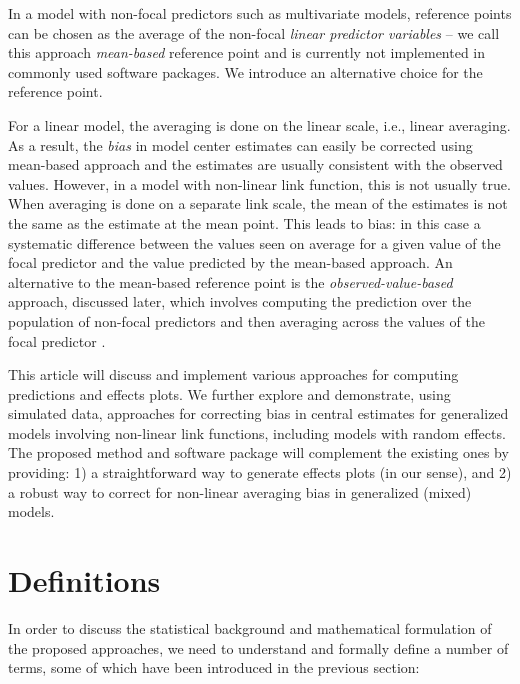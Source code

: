 In a model with non-focal predictors such as multivariate models, reference points can be chosen as the average of the non-focal \emph{linear predictor variables} -- we call this approach \emph{mean-based} reference point and is currently not implemented in commonly used  software packages. We introduce an alternative choice for the reference point.

For a linear model, the averaging is done on the linear scale, i.e., linear averaging. As a result, the \emph{bias} in model center estimates can easily be corrected using mean-based approach and the estimates are usually consistent with the observed values.  
However, in a model with non-linear link function, this is not usually true. When averaging is done on a separate link scale, the mean of the estimates is not the same as the estimate at the mean point. 
This leads to bias: in this case a systematic difference between the values seen on average for a given value of the focal predictor and the value predicted by the mean-based approach. 
An alternative to the mean-based reference point is the \emph{observed-value-based} approach, discussed later, which involves computing the prediction over the population of non-focal predictors and then averaging across the values of the focal predictor \citep{hanmer2013behind}. 

This article will discuss and implement various approaches for computing predictions and effects plots. We further explore and demonstrate, using simulated data, approaches for correcting bias in central estimates for generalized models involving non-linear link functions, including models with random effects. The proposed method and  software package will complement the existing ones by providing: 1) a straightforward way to generate effects plots (in our sense), and 2) a robust way to correct for non-linear averaging bias in generalized (mixed) models. 

\section{Definitions}

In order to discuss the statistical background and mathematical formulation of the proposed approaches, we need to understand and formally define a number of terms, some of which have been introduced in the previous section:

